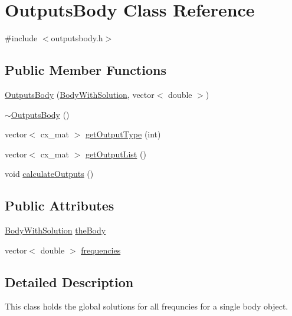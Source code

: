 \hypertarget{class_outputs_body}{\section{Outputs\-Body Class Reference}
\label{class_outputs_body}
}


{\ttfamily \#include $<$outputsbody.\-h$>$}

\subsection*{Public Member Functions}
\begin{DoxyCompactItemize}
\item 
\hyperlink{class_outputs_body_a0eac4499cabfe665627c5ae248d716fb}{Outputs\-Body} (\hyperlink{class_body_with_solution}{Body\-With\-Solution}, vector$<$ double $>$)
\item 
\hyperlink{class_outputs_body_a9ec0c3721f511168c425b792bdaf2d62}{$\sim$\-Outputs\-Body} ()
\item 
vector$<$ cx\-\_\-mat $>$ \hyperlink{class_outputs_body_a648ab9c3d60a0570d20265ec3a8a7e74}{get\-Output\-Type} (int)
\item 
vector$<$ cx\-\_\-mat $>$ \hyperlink{class_outputs_body_ad3930dfef26bd650ab09c8f0e05315b3}{get\-Output\-List} ()
\item 
void \hyperlink{class_outputs_body_a410ed10a395c4d1a598edfdd0f791e0a}{calculate\-Outputs} ()
\end{DoxyCompactItemize}
\subsection*{Public Attributes}
\begin{DoxyCompactItemize}
\item 
\hyperlink{class_body_with_solution}{Body\-With\-Solution} \hyperlink{class_outputs_body_aa03c8f557f55a5e8b806f4fc62397198}{the\-Body}
\item 
vector$<$ double $>$ \hyperlink{class_outputs_body_a625ad12a75ab02375ec369c47bfa4b52}{frequencies}
\end{DoxyCompactItemize}


\subsection{Detailed Description}
This class holds the global solutions for all frequncies for a single body object. 

